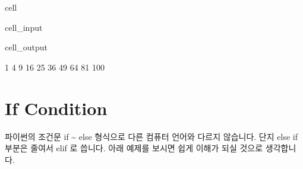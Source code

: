 \documentclass[letterpaper,10pt,english]{jupyterBook}
\begin{document}
\begin{sphinxuseclass}{cell}\begin{sphinxVerbatimInput}

\begin{sphinxuseclass}{cell_input}
\begin{sphinxVerbatim}[commandchars=\\\{\}]
  
        
\end{sphinxVerbatim}

\end{sphinxuseclass}\end{sphinxVerbatimInput}
\begin{sphinxVerbatimOutput}

\begin{sphinxuseclass}{cell_output}
\begin{sphinxVerbatim}[commandchars=\\\{\}]
1
4
9
16
25
36
49
64
81
100
\end{sphinxVerbatim}

\end{sphinxuseclass}\end{sphinxVerbatimOutput}

\end{sphinxuseclass}

\section{If Condition}
\label{\detokenize{chapter2/2.1.4_Python_Basics:if-condition}}\label{\detokenize{chapter2/2.1.4_Python_Basics::doc}}
\sphinxAtStartPar
파이썬의 조건문 if \textasciitilde{} else 형식으로 다른 컴퓨터 언어와 다르지 않습니다. 단지 else if 부분은 줄여서 elif 로 씁니다. 아래 예제를 보시면 쉽게 이해가 되실 것으로 생각합니다.
\end{document}
